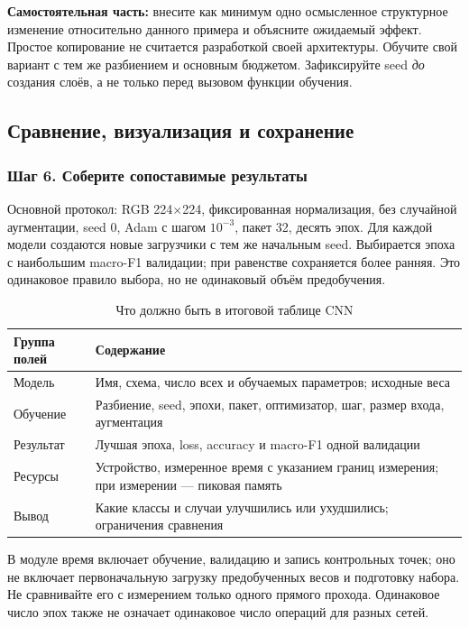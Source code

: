 \textbf{Самостоятельная часть:} внесите как минимум одно осмысленное структурное изменение относительно данного примера и объясните ожидаемый эффект. Простое копирование  не считается разработкой своей архитектуры. Обучите свой вариант с тем же разбиением и основным бюджетом. Зафиксируйте seed \emph{до} создания слоёв, а не только перед вызовом функции обучения.

\subsection{Сравнение, визуализация и сохранение}
\subsubsection*{Шаг 6. Соберите сопоставимые результаты}
Основной протокол: RGB 224\(\times\)224, фиксированная нормализация, без случайной аугментации, seed 0, Adam с шагом \(10^{-3}\), пакет 32, десять эпох. Для каждой модели создаются новые загрузчики с тем же начальным seed. Выбирается эпоха с наибольшим macro-F1 валидации; при равенстве сохраняется более ранняя. Это одинаковое правило выбора, но не одинаковый объём предобучения.

\begin{table}[H]\centering\small
\caption{Что должно быть в итоговой таблице CNN}
\begin{tabularx}{\textwidth}{@{}p{}Y@{}}
\toprule
Группа полей & Содержание \\
\midrule
Модель & Имя, схема, число всех и обучаемых параметров; исходные веса \\
Обучение & Разбиение, seed, эпохи, пакет, оптимизатор, шаг, размер входа, аугментация \\
Результат & Лучшая эпоха, loss, accuracy и macro-F1 одной валидации \\
Ресурсы & Устройство, измеренное время с указанием границ измерения; при измерении --- пиковая память \\
Вывод & Какие классы и случаи улучшились или ухудшились; ограничения сравнения \\
\bottomrule
\end{tabularx}\end{table}

В модуле время включает обучение, валидацию и запись контрольных точек; оно не включает первоначальную загрузку предобученных весов и подготовку набора. Не сравнивайте его с измерением только одного прямого прохода. Одинаковое число эпох также не означает одинаковое число операций для разных сетей.

